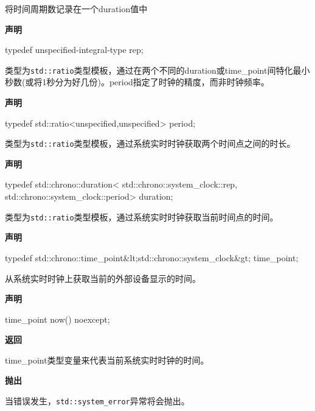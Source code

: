 将时间周期数记录在一个duration值中

\textbf{声明}

\begin{cpp}
typedef unspecified-integral-type rep;
\end{cpp}


类型为\texttt{std::ratio}类型模板，通过在两个不同的duration或time\_point间特化最小秒数(或将1秒分为好几份)。period指定了时钟的精度，而非时钟频率。

\textbf{声明}

\begin{cpp}
typedef std::ratio<unspecified,unspecified> period;
\end{cpp}


类型为\texttt{std::ratio}类型模板，通过系统实时时钟获取两个时间点之间的时长。

\textbf{声明}

\begin{cpp}
typedef std::chrono::duration<
   std::chrono::system_clock::rep,
   std::chrono::system_clock::period> duration;
\end{cpp}


类型为\texttt{std::ratio}类型模板，通过系统实时时钟获取当前时间点的时间。

\textbf{声明}

\begin{cpp}
typedef std::chrono::time_point&lt;std::chrono::system_clock&gt; time_point;
\end{cpp}


从系统实时时钟上获取当前的外部设备显示的时间。

\textbf{声明}

\begin{cpp}
time_point now() noexcept;
\end{cpp}

\textbf{返回}

time\_point类型变量来代表当前系统实时时钟的时间。

\textbf{抛出}

当错误发生，\texttt{std::system\_error}异常将会抛出。


